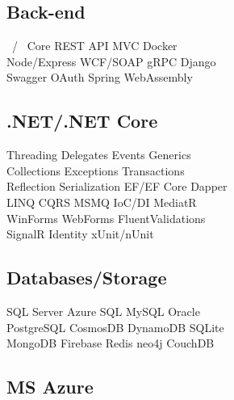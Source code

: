 \documentclass[letterpaper]{cv_12} %
\begin{document}
\begin{minipage}[t]{0.39\textwidth}
    \sectionspace%

    \subsection{Back-end}

    \dotnet\ / \dotnet\ Core \textbullet{} REST API \textbullet{} MVC
    \textbullet{} Docker\\
    Node/Express \textbullet{} WCF/SOAP \textbullet{} gRPC \textbullet{}
    Django\\
    Swagger \textbullet{} OAuth \textbullet{} Spring \textbullet{}
    WebAssembly

    \sectionspace%

    \subsection{.NET/.NET Core}

    Threading \textbullet{} Delegates \textbullet{} Events \textbullet{}
    Generics\\
    Collections \textbullet{} Exceptions \textbullet{} Transactions\\
    Reflection \textbullet{} Serialization \textbullet{} EF/EF Core
    \textbullet{} Dapper\\
    LINQ \textbullet{} CQRS \textbullet{} MSMQ \textbullet{} IoC/DI
    \textbullet{} MediatR\\
    WinForms \textbullet{} WebForms \textbullet{} FluentValidations\\
    SignalR \textbullet{} Identity \textbullet{} xUnit/nUnit

    \sectionspace%

    \subsection{Databases/Storage}

    SQL Server \textbullet{} Azure SQL \textbullet{} MySQL \textbullet{}
    Oracle\\
    PostgreSQL \textbullet{} CosmosDB \textbullet{} DynamoDB \textbullet{}
    SQLite\\
    MongoDB \textbullet{} Firebase \textbullet{} Redis \textbullet{} neo4j
    \textbullet{} CouchDB

    \sectionspace%

    \subsection{MS Azure}


\end{minipage}
\end{document}
